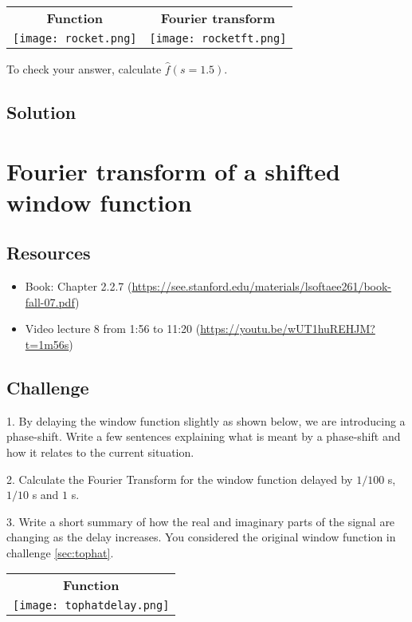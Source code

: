 \begin{tabular}{cc}
    \textbf{Function} & \textbf{Fourier transform} \\
    \texttt{[image: rocket.png]} & \texttt{[image: rocketft.png]}
\end{tabular}

To check your answer, calculate $\hat{f}(s=1.5)$.

\subsection*{Solution}




\newpage
\section{Fourier transform of a shifted window function}

\subsection*{Resources}
\begin{itemize}
    \item Book: Chapter 2.2.7 (\url{https://see.stanford.edu/materials/lsoftaee261/book-fall-07.pdf})
    \item Video lecture 8 from 1:56 to 11:20 (\url{https://youtu.be/wUT1huREHJM?t=1m56s})
\end{itemize}

\subsection*{Challenge}
1. By delaying the window function slightly as shown below, we are introducing a phase-shift. Write a few sentences explaining what is meant by a phase-shift and how it relates to the current situation.

2. Calculate the Fourier Transform for the window function delayed by $1/100$ s, $1/10$ s and $1$ s.

3. Write a short summary of how the real and imaginary parts of the signal are changing as the delay increases. You considered the original window function in challenge \ref{sec:tophat}.

\begin{tabular}{c}
    \textbf{Function} \\
    \texttt{[image: tophatdelay.png]}
\end{tabular}

